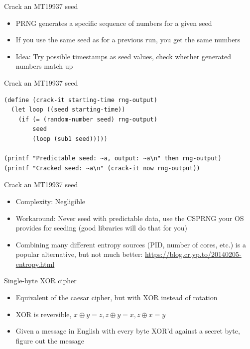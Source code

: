 \documentclass[presentation]{beamer}
\begin{document}
\begin{frame}[label=sec-2-4]{Crack an MT19937 seed}
\begin{itemize}
\item PRNG generates a specific sequence of numbers for a given seed
\item If you use the same seed as for a previous run, you get the same numbers
\item Idea: Try possible timestamps as seed values, check whether
generated numbers match up
\end{itemize}
\end{frame}

\begin{frame}[fragile,label=sec-2-5]{Crack an MT19937 seed}
 \begin{verbatim}
(define (crack-it starting-time rng-output)
  (let loop ((seed starting-time))
    (if (= (random-number seed) rng-output)
        seed
        (loop (sub1 seed)))))

(printf "Predictable seed: ~a, output: ~a\n" then rng-output)
(printf "Cracked seed: ~a\n" (crack-it now rng-output))
\end{verbatim}
\end{frame}

\begin{frame}[label=sec-2-6]{Crack an MT19937 seed}
\begin{itemize}
\item Complexity: Negligible
\item Workaround: Never seed with predictable data, use the CSPRNG your OS
provides for seeding (good libraries will do that for you)
\item Combining many different entropy sources (PID, number of cores,
etc.) is a popular alternative, but not much better:
\url{https://blog.cr.yp.to/20140205-entropy.html}
\end{itemize}
\end{frame}

\begin{frame}[label=sec-2-7]{Single-byte XOR cipher}
\begin{itemize}
\item Equivalent of the caesar cipher, but with XOR instead of rotation
\item XOR is reversible, $x \oplus y = z, z \oplus y = x, z \oplus x = y$
\item Given a message in English with every byte XOR'd against a secret
byte, figure out the message
\end{itemize}
\end{frame}
\end{document}
